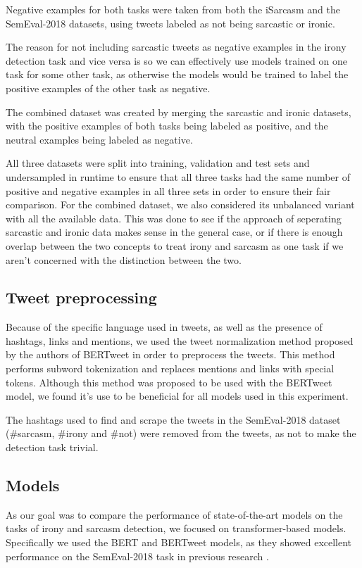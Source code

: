 \documentclass[10pt, a4paper]{article}
\begin{document}
Negative examples for both tasks were taken from both the iSarcasm and the SemEval-2018 datasets, using tweets labeled as
not being sarcastic or ironic.

The reason for not including sarcastic tweets as negative examples in the irony detection task and vice versa is so we
can effectively use models trained on one task for some other task, as otherwise the models would be trained
to label the positive examples of the other task as negative.

The combined dataset was created by merging the sarcastic and ironic datasets, with the positive examples of both tasks
being labeled as positive, and the neutral examples being labeled as negative.

All three datasets were split into training, validation and test sets and undersampled in runtime to ensure that all three
tasks had the same number of positive and negative examples in all three sets in order to ensure their fair comparison. For
the combined dataset, we also considered its unbalanced variant with all the available data. This was done to see if the 
approach of seperating sarcastic and ironic data makes sense in the general case, or if there is enough overlap between 
the two concepts to treat irony and sarcasm as one task if we aren't concerned with the distinction between the two.

\subsection{Tweet preprocessing}
Because of the specific language used in tweets, as well as the presence of hashtags, links and mentions, we used the
tweet normalization method proposed by the authors of BERTweet \citep{bertweet} in order to preprocess the tweets. This method
performs subword tokenization and replaces mentions and links with special tokens. Although this method was proposed to be 
used with the BERTweet model, we found it's use to be beneficial for all models used in this experiment.

The hashtags used to find and scrape the tweets in the SemEval-2018 dataset (\#sarcasm, \#irony and \#not) were removed
from the tweets, as not to make the detection task trivial.

\subsection{Models}\label{sec:models}

As our goal was to compare the performance of state-of-the-art models on the tasks of irony and sarcasm detection, we 
focused on transformer-based models. Specifically we used the BERT \citep{devlin-etal-2019-bert} and BERTweet \citep{bertweet} models,
as they showed excellent performance on the SemEval-2018 task in previous research \citep{transformers4irony-2020,bertweet}.
\end{document}
